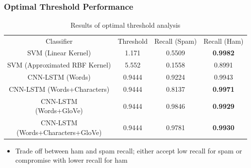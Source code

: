 \documentclass{beamer}
\begin{document}
\subsection{}
\begin{framefont}{\footnotesize}
	\begin{frame}
		\frametitle{Optimal Threshold Performance}
		\begin{table}
			\centering
			\bgroup
			\def\arraystretch{1.5}
			\begin{tabular}{|c|c|c|c|} \hline
				Classifier & Threshold & Recall (Spam) & Recall (Ham) \\ \hhline{|=|=|=|=|}
				SVM (Linear Kernel) & 1.171 & \color{red} 0.5509 & \textbf{0.9982} \\ \hline
				SVM (Approximated RBF Kernel) & 5.552 & 0.1558 & 0.8991 \\ \hline
				CNN-LSTM (Words) & 0.9444 & 0.9224 & 0.9943 \\ \hline
				CNN-LSTM (Words+Characters) & 0.9444  & \color{red} 0.8137 &  \textbf{0.9971} \\ \hline
				\makecell{CNN-LSTM \\(Words+GloVe)} & 0.9444  & \color{ao(english)} 0.9846  & \textbf{0.9929} \\ \hline
				\makecell{CNN-LSTM \\(Words+Characters+GloVe)} & 0.9444 & \color{ao(english)} 0.9781 & \textbf{0.9930} \\ \hline
			\end{tabular}
			\egroup
			\caption{Results of optimal threshold analysis}
		\end{table}
		\begin{itemize}
			\item Trade off between ham and spam recall; either accept low recall for spam or compromise with lower recall for ham
		\end{itemize}
	\end{frame}
\end{framefont}
\end{document}
